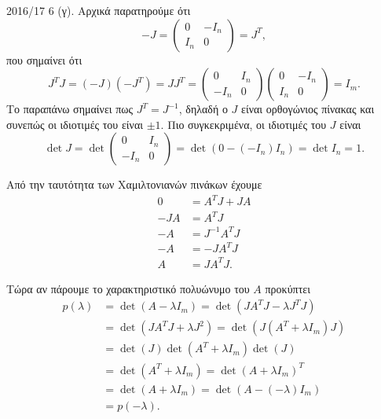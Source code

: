 \begin{solution}{2016/17 6}
    (γ). Αρχικά παρατηρούμε ότι
    \[
        -J = \begin{pmatrix}
            0 & -I_n \\
            I_n & 0
        \end{pmatrix} = J^T,
    \]
    που σημαίνει ότι
    \[
        J^{T}J = (-J) (-J^T) = JJ^T =
        \begin{pmatrix}
            0 & I_n \\
            -I_n & 0
        \end{pmatrix}
        \begin{pmatrix}
            0 & -I_n \\
            I_n & 0
        \end{pmatrix} = I_m.
    \]
    Το παραπάνω σημαίνει πως \( J^T = J^{-1} \), δηλαδή ο \( J \) είναι ορθογώνιος
    πίνακας και συνεπώς οι ιδιοτιμές του είναι \( \pm 1 \). Πιο συγκεκριμένα, οι
    ιδιοτιμές του \( J \) είναι
    \[
        \det{J} = \det{\begin{pmatrix}0 & I_n\\ -I_n & 0\end{pmatrix}} =
        \det{\left( 0 - (-I_n)I_n \right)} = \det{I_n} = 1.
    \]

    Από την ταυτότητα των Χαμιλτονιανών πινάκων έχουμε
    \begin{align*}
        0 &= A^{T}J + JA \\
        -JA &= A^{T}J \\
        -A &= J^{-1}A^{T}J \\
        -A &= -JA^{T}J \\
        A &= JA^{T}J.
    \end{align*}

    Τώρα αν πάρουμε το χαρακτηριστικό πολυώνυμο του \( A \) προκύπτει
    \begin{align*}
        p(\lambda) &= \det{\left( A - \lambda I_m \right)}
        = \det{\left( JA^{T}J - \lambda J^{T}J \right)} \\
        &= \det{\left( JA^{T}J + \lambda J^{2} \right)}
        = \det{\left( J\left(A^{T} + \lambda I_m\right)J \right)} \\
        &= \det{\left( J \right)}
        \det{\left( A^T + \lambda I_m \right)}
        \det{\left( J \right)}\\
        &= \det{\left( A^T + \lambda I_m \right)}
        = \det{\left( A + \lambda I_m \right)^{T}}\\
        &= \det{\left( A + \lambda I_m \right)}
        = \det{\left( A - (-\lambda) I_m \right)}\\
        &= p(-\lambda).
    \end{align*}


\end{solution}
